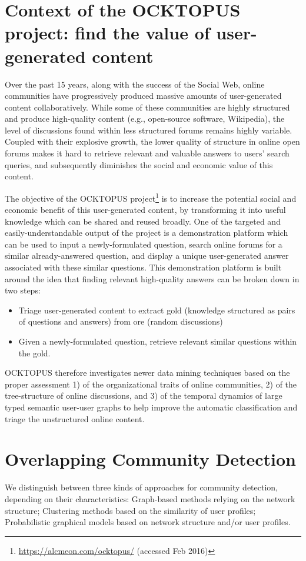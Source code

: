 \section{Context of the OCKTOPUS project: find the value of user-generated content}
Over the past 15 years, along with the success of the Social Web, online communities have progressively produced massive amounts of user-generated content collaboratively.
While some of these communities are highly structured and produce high-quality content (e.g., open-source software, Wikipedia), the level of discussions found within less structured forums remains highly variable. Coupled with their explosive growth, the lower quality of structure in online open forums makes it hard to retrieve relevant and valuable answers to users' search queries, and subsequently diminishes the social and economic value of this content.

The objective of the OCKTOPUS project\footnote{\url{https://alcmeon.com/ocktopus/} (accessed Feb 2016)} is to increase the potential social and economic benefit of this user-generated content, by transforming it into useful knowledge which can be shared and reused broadly. 
One of the targeted and easily-understandable output of the project is a demonstration platform which can be used to input a newly-formulated question, search online forums for a similar already-answered question, and display a unique user-generated answer associated with these similar questions.
This demonstration platform is built around the idea that finding relevant high-quality answers can be broken down in two steps:
\begin{itemize}
\item{Triage user-generated content to extract gold (knowledge structured as pairs of questions and answers) from ore (random discussions)}
\item{Given a newly-formulated question, retrieve relevant similar questions within the gold.}
\end{itemize}
OCKTOPUS therefore investigates newer data mining techniques based on the proper assessment 1) of the organizational traits of online communities, 2) of the tree-structure of online discussions, and 3) of the temporal dynamics of large typed semantic user-user graphs to help improve the automatic classification and triage the unstructured online content.



\section{Overlapping Community Detection}
We distinguish between three kinds of approaches for community detection, depending on their characteristics: Graph-based methods relying on the network structure; Clustering methods based on the similarity of user profiles; Probabilistic graphical models based on network structure and/or user profiles.

